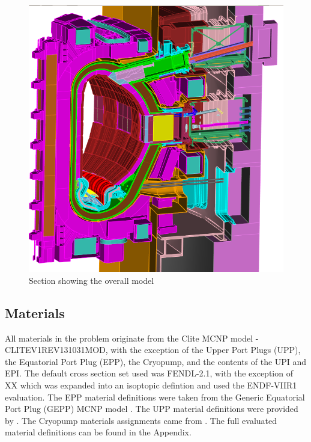 \documentclass[12pt]{article}
\begin{document}
\begin{figure}[p]
  \centering
  \includegraphics[scale=0.8]{../plots/cad/global_zoom.png}
  \caption{Section showing the overall model}
  \label{fig:cad_iter_global_zoom}
\end{figure}

\subsection{Materials}
All materials in the problem originate from the Clite MCNP model - CLITE\textunderscore V1\textunderscore REV131031\textunderscore MOD, with the exception of the Upper Port Plugs (UPP), the Equatorial Port Plug (EPP), the Cryopump, and the contents of the UPI and EPI. The default cross section set used was FENDL-2.1, with the exception of XX which was expanded into an isoptopic defintion and used the ENDF-VIIR1 evaluation. The EPP material definitions were taken from the Generic Equatorial Port Plug (GEPP) MCNP model \cite{epp_materials}. The UPP material definitions were provided by \cite{bertalot_communication}. The Cryopump materials assignments came from \cite{cryopump_communication}. The full evaluated material definitions can be found in the Appendix.
\end{document}
